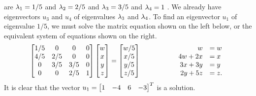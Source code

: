 \documentclass[a4paper]{article}
\begin{document}
\begin{solution}
\begin{itemize}
   are $\lambda_1=1/5$ and $\lambda_2=2/5$ and $\lambda_3=3/5$ and $\lambda_4=1$ \mk.  We
   already have eigenvectors $u_3$ and $u_4$ of eigenvalues $\lambda_3$
   and $\lambda_4$.  To find an eigenvector $u_1$ of eigenvalue $1/5$, we
   must solve the matrix equation shown on the left below, or the
   equivalent system of equations shown on the right.
   \[ 
        \left[\begin{matrix}
         1/5 &   0 &   0 & 0 \\
         4/5 & 2/5 &   0 & 0 \\
           0 & 3/5 & 3/5 & 0 \\
           0 &   0 & 2/5 & 1 
        \end{matrix}\right]
        \left[\begin{matrix} w \\ x \\ y \\ z \end{matrix}\right]
        = 
        \left[\begin{matrix} w/5 \\ x/5 \\ y/5 \\ z/5 \end{matrix}\right] 
        \hspace{5em}
        \begin{array}{rl}
         w &= w \\
         4w+2x &= x \\
         3x+3y &= y \\
         2y+5z &= z.
        \end{array}
   \]
   It is clear that the vector $u_1=\left[\begin{matrix} 1&-4&6&-3\end{matrix}\right]^T$ is a
   solution. 


\end{itemize}
\end{solution}
\end{document}

